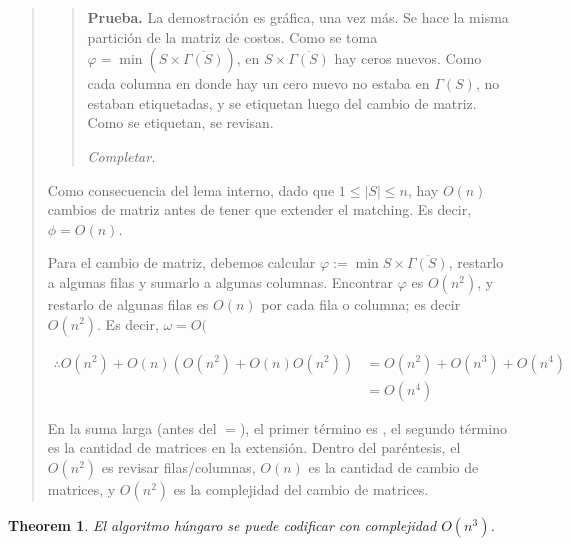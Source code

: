 \documentclass[a4paper]{article}
\newtheorem{theorem}{Theorem}
\newtheorem{theorem}{Theorem}
\begin{document}
\begin{quote}
\begin{quote}

\textbf{Prueba.} La demostración es gráfica, una vez más. Se hace la misma partición de la
matriz de costos. Como se toma $\varphi = \min (S \times \overline{\Gamma(S)})$, en 
$S \times \overline{\Gamma(S)}$ hay ceros nuevos. Como cada columna 
en donde hay un cero nuevo no estaba en $\Gamma(S)$, no estaban etiquetadas,
y se etiquetan luego del cambio de matriz. Como se etiquetan, se revisan.

\textit{Completar.}

\end{quote}

Como consecuencia del lema interno, dado que $1 \leq |S| \leq n $, hay $O(n)$
cambios de matriz antes de tener que extender el matching. Es decir,
$\phi = O(n)$.

Para el cambio de matriz, debemos calcular $\varphi := \min S \times \overline{\Gamma(S)}$,
restarlo a algunas filas y sumarlo a algunas columnas. Encontrar $\varphi$
es $O(n^2)$, y restarlo de algunas filas es $O(n)$ por cada fila o columna; 
es decir $O(n^2)$. Es decir, $\omega = O($

\begin{align*}
    \therefore O(n^2) + O(n)\left( O(n^2) + O(n)O(n^2) \right) &= O(n^2) + O(n^3) + O(n^4) \\ 
    &= O(n^4)
\end{align*}

En la suma larga (antes del $=$), el primer término es , el segundo término es
la cantidad de matrices en la extensión. Dentro del paréntesis, el $O(n^2)$ es
revisar filas/columnas, $O(n)$ es la cantidad de cambio de matrices, y $O(n^2)$
es la complejidad del cambio de matrices.

\end{quote}
\normalsize

\begin{theorem}
    El algoritmo húngaro se puede codificar con complejidad $O(n^3)$.
\end{theorem}
\end{document}
